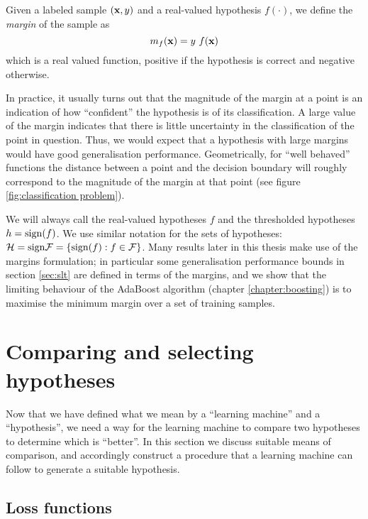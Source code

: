 \begin{definition}
Given a labeled sample $(\mathbf{x}, y)$ and a real-valued hypothesis
$f(\cdot)$, we define the \emph{margin} of the sample as
%
\begin{equation}
m_{f}(\mathbf{x}) = y\ f(\mathbf{x})
\end{equation}
%
which is a real valued function, positive if the hypothesis is correct
and negative otherwise.
\end{definition}

In practice, it usually turns out that the magnitude of the margin at
a point is an indication of how ``confident'' the hypothesis is
of its classification.  A large value of the margin indicates that
there is little uncertainty in the classification of the point in
question.  Thus, we would expect that a hypothesis with large margins
would have good generalisation performance.  Geometrically, for ``well
behaved'' functions the distance between a point and the decision
boundary will roughly correspond to the magnitude of the margin at
that point (see figure \ref{fig:classification problem}).

We will always call the real-valued hypotheses $f$ and the
thresholded hypotheses $h = \mathrm{sign}(f)$.  We use similar notation for
the sets of hypotheses: $\mathcal{H} = \mathrm{sign} \mathcal{F} = \{ \mathrm{sign}(f) : f \in
\mathcal{F} \}$.  Many results later in this thesis make use of the margins
formulation; in particular some generalisation performance bounds in
section \ref{sec:slt} are defined in terms of the margins, and we show
that the limiting behaviour of the AdaBoost algorithm (chapter
\ref{chapter:boosting}) is to maximise the minimum margin over a set of
training samples.

\section{Comparing and selecting hypotheses}
\label{sec:comparing and selecting}

Now that we have defined what we mean by a ``learning machine'' and a
``hypothesis'', we need a way for the learning machine to compare two
hypotheses to determine which is ``better''.  In this section we
discuss suitable means of comparison, and accordingly construct a
procedure that a learning machine can follow to generate a suitable
hypothesis.

\subsection{Loss functions}
\label{sec:loss function}

